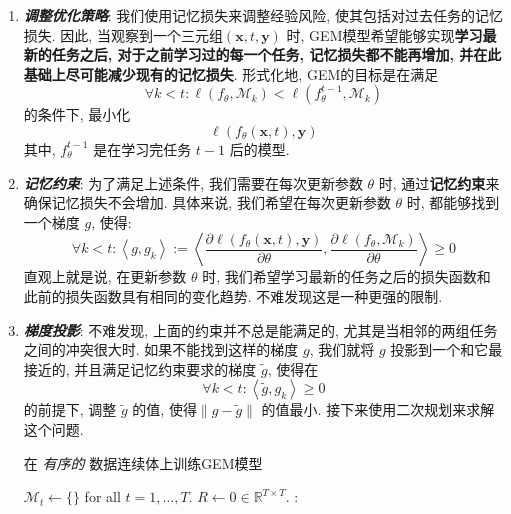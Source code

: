 \begin{enumerate}[label={},wide,labelwidth=!,itemindent=!,labelindent=0pt]
    \item \textbf{\textit{调整优化策略}}: 我们使用记忆损失来调整经验风险, 使其包括对过去任务的记忆损失. 因此, 当观察到一个三元组$(\boldsymbol{x}, t, \boldsymbol{y})$ 时, GEM模型希望能够实现\textbf{学习最新的任务之后, 对于之前学习过的每一个任务, 记忆损失都不能再增加, 并在此基础上尽可能减少现有的记忆损失}. 形式化地, GEM的目标是在满足
    \[
        \forall k < t: \ell(f_{\theta}, \mathcal{M}_{k}) < \ell(f_{\theta}^{t-1}, \mathcal{M}_{k}) 
    \]
    的条件下, 最小化
    \[
        \ell\left(f_{\theta}(\boldsymbol{x}, t), \boldsymbol{y}\right)
    \]
    其中, $f_\theta^{t-1}$ 是在学习完任务 $t-1$ 后的模型.
    \item \textbf{\textit{记忆约束}}: 为了满足上述条件, 我们需要在每次更新参数 $\theta$ 时, 通过\textbf{记忆约束}来确保记忆损失不会增加. 具体来说, 我们希望在每次更新参数 $\theta$ 时, 都能够找到一个梯度 $g$, 使得:
    \[
        \forall k<t:\left\langle g, g_{k}\right\rangle:=\left\langle\frac{\partial \ell\left(f_{\theta}(\boldsymbol{x}, t), \boldsymbol{y}\right)}{\partial \theta}, \frac{\partial \ell\left(f_{\theta}, \mathcal{M}_{k}\right)}{\partial \theta}\right\rangle \geq 0
    \]
    \noindent 直观上就是说, 在更新参数 $\theta$ 时, 我们希望学习最新的任务之后的损失函数和此前的损失函数具有相同的变化趋势. 不难发现这是一种更强的限制.
    \item \textbf{\textit{梯度投影}}: 不难发现, 上面的约束并不总是能满足的, 尤其是当相邻的两组任务之间的冲突很大时. 如果不能找到这样的梯度 $g$, 我们就将 $g$ 投影到一个和它最接近的, 并且满足记忆约束要求的梯度 $\tilde{g}$, 使得在
    \[
        \forall k < t: \left\langle\tilde{g}, g_{k}\right\rangle \geq 0
    \]
    的前提下, 调整 $\tilde{g}$ 的值, 使得$\|g-\tilde{g}\|$ 的值最小. 接下来使用二次规划来求解这个问题. 
    \begin{algorithm}
        \caption{在 \emph{有序的} 数据连续体上训练GEM模型}
        \label{alg:gem:train}
        \begin{minipage}[t]{.5\linewidth}
        \begin{algorithmic}
        \small
            \State $\mathcal{M}_t \leftarrow \lbrace\rbrace$ for all $t = 1, \ldots, T$.
            \State $R \leftarrow 0 \in \mathbb{R}^{T\times T}$. 
            :

\end{algorithmic}
\end{minipage}
\end{algorithm}
\end{enumerate}
